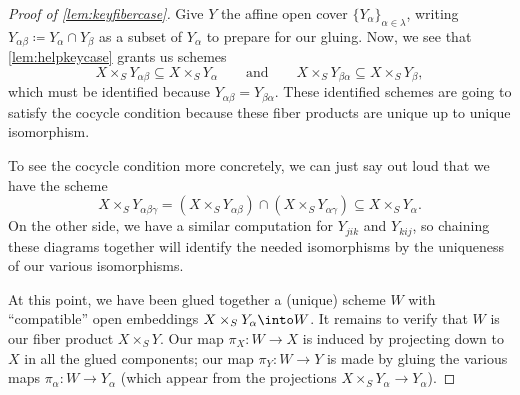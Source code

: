 \documentclass[../notes.tex]{subfiles}
\begin{document}
\begin{proof}[Proof of \autoref{lem:keyfibercase}]
	Give $Y$ the affine open cover $\{Y_\alpha\}_{\alpha\in\lambda}$, writing $Y_{\alpha\beta}\coloneqq Y_\alpha\cap Y_\beta$ as a subset of $Y_\alpha$ to prepare for our gluing. Now, we see that \autoref{lem:helpkeycase} grants us schemes
	\[X\times_SY_{\alpha\beta}\subseteq X\times_SY_\alpha\qquad\text{and}\qquad X\times_SY_{\beta\alpha}\subseteq X\times_SY_\beta,\]
	which must be identified because $Y_{\alpha\beta}=Y_{\beta\alpha}$. These identified schemes are going to satisfy the cocycle condition because these fiber products are unique up to unique isomorphism.

	To see the cocycle condition more concretely, we can just say out loud that we have the scheme
	\[X\times_SY_{\alpha\beta\gamma}=(X\times_SY_{\alpha\beta})\cap(X\times_SY_{\alpha\gamma})\subseteq X\times_SY_\alpha.\]
	On the other side, we have a similar computation for $Y_{jik}$ and $Y_{kij}$, so chaining these diagrams together will identify the needed isomorphisms by the uniqueness of our various isomorphisms.

	At this point, we have been glued together a (unique) scheme $W$ with ``compatible'' open embeddings $X\times_SY_\alpha\into W$. It remains to verify that $W$ is our fiber product $X\times_SY$. Our map $\pi_X\colon W\to X$ is induced by projecting down to $X$ in all the glued components; our map $\pi_Y\colon W\to Y$ is made by gluing the various maps $\pi_\alpha\colon W\to Y_\alpha$ (which appear from the projections $X\times_SY_\alpha\to Y_\alpha$).
	

\end{proof}
\end{document}
